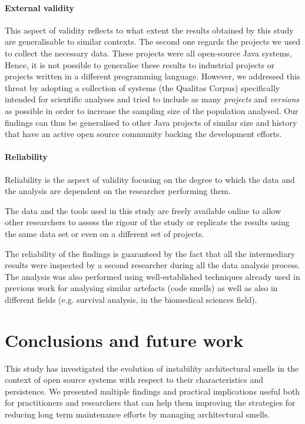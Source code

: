 \paragraph{External validity}
This aspect of validity reflects to what extent the results obtained by this study are generalisable to similar contexts.
The second one regards the projects we used to collect the necessary data. These projects were all open-source Java systems, Hence, it is not possible to generalise these results to industrial projects or projects written in a different programming language.
However, we addressed this threat by adopting a collection of systems (the Qualitas Corpus) specifically intended for scientific analyses and tried to include as many \emph{projects} and \emph{versions} as possible in order to increase the sampling size of the population analysed.
Our findings can thus be generalised to other Java projects of similar size and history that have an active open source community backing the development efforts.

\paragraph{Reliability}
Reliability is the aspect of validity focusing on the degree to which the data and the analysis are dependent on the researcher performing them.

The data and the tools used in this study are freely available online to allow other researchers to assess the rigour of the study or replicate the results using the same data set or even on a different set of projects.

The reliability of the findings is guaranteed by the fact that all the intermediary results were inspected by a second researcher during all the data analysis process.
The analysis was also performed using well-established techniques already used in previous work for analysing similar artefacts (code smells) as well as also in different fields (e.g. survival analysis, in the biomedical sciences field).


\section{Conclusions and future work}\label{c2:sec:conclusions}
This study has investigated the evolution of instability architectural smells in the context of open source systems with respect to their characteristics and persistence.
We presented multiple findings and practical implications useful both for practitioners and researchers that can help them improving the strategies for reducing long term maintenance efforts by managing architectural smells.

